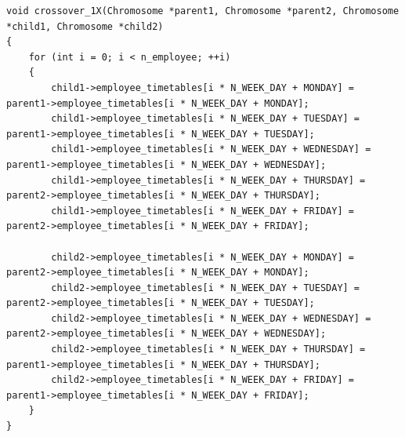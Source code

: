 \documentclass{article}
\begin{document}
        \begin{lstlisting}
void crossover_1X(Chromosome *parent1, Chromosome *parent2, Chromosome *child1, Chromosome *child2)
{
    for (int i = 0; i < n_employee; ++i)
    {
        child1->employee_timetables[i * N_WEEK_DAY + MONDAY] = parent1->employee_timetables[i * N_WEEK_DAY + MONDAY];
        child1->employee_timetables[i * N_WEEK_DAY + TUESDAY] = parent1->employee_timetables[i * N_WEEK_DAY + TUESDAY];
        child1->employee_timetables[i * N_WEEK_DAY + WEDNESDAY] = parent1->employee_timetables[i * N_WEEK_DAY + WEDNESDAY];
        child1->employee_timetables[i * N_WEEK_DAY + THURSDAY] = parent2->employee_timetables[i * N_WEEK_DAY + THURSDAY];
        child1->employee_timetables[i * N_WEEK_DAY + FRIDAY] = parent2->employee_timetables[i * N_WEEK_DAY + FRIDAY];

        child2->employee_timetables[i * N_WEEK_DAY + MONDAY] = parent2->employee_timetables[i * N_WEEK_DAY + MONDAY];
        child2->employee_timetables[i * N_WEEK_DAY + TUESDAY] = parent2->employee_timetables[i * N_WEEK_DAY + TUESDAY];
        child2->employee_timetables[i * N_WEEK_DAY + WEDNESDAY] = parent2->employee_timetables[i * N_WEEK_DAY + WEDNESDAY];
        child2->employee_timetables[i * N_WEEK_DAY + THURSDAY] = parent1->employee_timetables[i * N_WEEK_DAY + THURSDAY];
        child2->employee_timetables[i * N_WEEK_DAY + FRIDAY] = parent1->employee_timetables[i * N_WEEK_DAY + FRIDAY];
    }
}
\end{lstlisting}
        \newpage
\end{document}

